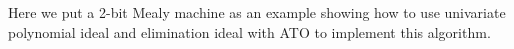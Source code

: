 \begin{figure}[hbt]
\end{figure}
Here we put a 2-bit Mealy machine as an example showing how to use univariate polynomial ideal
and elimination ideal with ATO to implement this algorithm.
